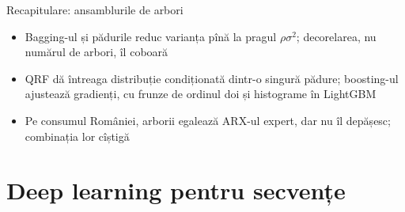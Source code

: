 \begin{frame}{Recapitulare: ansamblurile de arbori}
\itemsize{\small}
\begin{itemize}
    \item Bagging-ul și pădurile reduc varianța pînă la pragul $\rho\sigma^2$; decorelarea, nu numărul de arbori, îl coboară
    \item QRF dă întreaga distribuție condiționată dintr-o singură pădure; boosting-ul ajustează gradienți, cu frunze de ordinul doi și histograme în LightGBM
    \item Pe consumul României, arborii egalează ARX-ul expert, dar nu îl depășesc; combinația lor cîștigă
\end{itemize}
\end{frame}


\section{Deep learning pentru secvențe}

